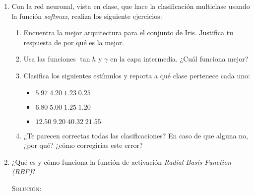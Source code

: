 \documentclass[letterpaper,11pt]{article}
\begin{document}
\begin{enumerate}
    \item Con la red neuronal, vista en clase, que hace la clasificación 
    multiclase usando la función \textit{softmax}, realiza los siguiente 
    ejercicios:
    \begin{enumerate}
        \item Encuentra la mejor arquitectura para el conjunto de Iris. 
        Justifica tu respuesta de por qué es la mejor.

        \item Usa las funciones $\tan h$ y $\gamma$ en la capa intermedia. ¿Cuál
        funciona mejor?

        \item Clasifica los siguientes estímulos y reporta a qué clase pertenece
        cada uno:
        \begin{itemize}
            \item $5.97 \; 4.20 \; 1.23 \; 0.25$
            \item $6.80 \; 5.00 \; 1.25 \; 1.20$
            \item $12.50 \; 9.20 \; 40.32 \; 21.55$
        \end{itemize}

        \item ¿Te parecen correctas todas las clasificaciones? En caso de que 
        alguna no, ¿por qué? ¿cómo corregirías este error?
    \end{enumerate}

    \item ¿Qué es y cómo funciona la función de activación \textit{Radial Basis
    Function (RBF)}?

    \textsc{Solución:}
\end{enumerate}
\end{document}
